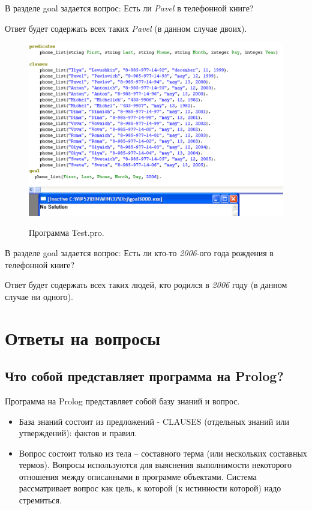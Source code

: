 \documentclass[a4paper,12pt]{article}
\begin{document}
	В разделе goal задается вопрос: Есть ли \textit{Pavel} в телефонной книге?
	
	Ответ будет содержать всех таких \textit{Pavel} (в данном случае двоих).

	\newpage
	
	\begin{figure}[h!]
		\begin{center}
			{\includegraphics[scale = 0.7]{program_3.png}}
			\label{prog_3}
		\end{center}
		\caption{Программа Test.pro.}
	\end{figure}

	
	В разделе goal задается вопрос: Есть ли кто-то \textit{2006}-ого года рождения в телефонной книге?
	
	Ответ будет содержать всех таких людей, кто родился в \textit{2006} году (в данном случае ни одного).
	
	\section{Ответы на вопросы}
	
	\subsection{Что собой представляет программа на Prolog?}
	
	Программа на Prolog представляет собой базу знаний и вопрос.
	
	\begin{itemize}
		\item База знаний состоит из предложений - CLAUSES (отдельных знаний или утверждений): фактов и правил.
	
		\item Вопрос состоит только из тела – составного терма (или нескольких составных термов). Вопросы используются для выяснения выполнимости некоторого отношения между описанными в программе объектами. Система рассматривает вопрос как цель, к которой (к истинности которой) надо стремиться.
	\end{itemize}
	
\end{document}
